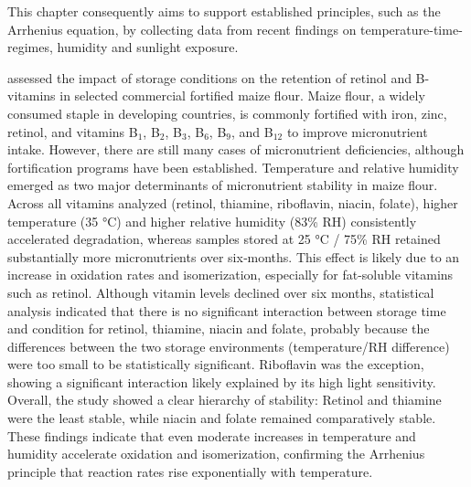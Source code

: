 This chapter consequently aims to support established principles, such as the Arrhenius equation, by collecting data from recent findings on temperature-time-regimes, humidity and sunlight exposure. \par 

\citet{chepkoech} assessed the impact of storage conditions on the retention of retinol and B-vitamins in selected commercial fortified maize flour. Maize flour, a widely consumed staple in developing countries, is commonly fortified with iron, zinc, retinol, and vitamins B$_1$, B$_2$, B$_3$, B$_6$, B$_9$, and B$_{12}$ to improve micronutrient intake. However, there are still many cases of micronutrient deficiencies, although fortification programs have been established. Temperature and relative humidity emerged as two major determinants of micronutrient stability in maize flour. Across all vitamins analyzed (retinol, thiamine, riboflavin, niacin, folate), higher temperature (35 °C) and higher relative humidity (83\% RH) consistently accelerated degradation, whereas samples stored at 25 °C / 75\% RH retained substantially more micronutrients over six‑months. This effect is likely due to an increase in oxidation rates and isomerization, especially for fat-soluble vitamins such as retinol. Although vitamin levels declined over six months, statistical analysis indicated that there is no significant interaction between storage time and condition for retinol, thiamine, niacin and folate, probably because the differences between the two storage environments (temperature/RH difference) were too small to be statistically significant. Riboflavin was the exception, showing a significant interaction likely explained by its high light sensitivity. Overall, the study showed a clear hierarchy of stability: Retinol and thiamine were the least stable, while niacin and folate remained comparatively stable. These findings indicate that even moderate increases in temperature and humidity accelerate oxidation and isomerization, confirming the Arrhenius principle that reaction rates rise exponentially with temperature.  \par

